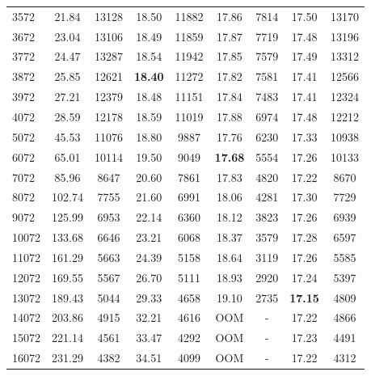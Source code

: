 \begin{table}[]
\begin{center}
\begin{tabular}{@{}lcccccccc@{}}
3572  & 21.84  & 13128 & 18.50 & 11882 & 17.86 & 7814 & 17.50 & 13170 \\
3672  & 23.04  & 13106 & 18.49 & 11859 & 17.87 & 7719 & 17.48 & 13196 \\
3772  & 24.47  & 13287 & 18.54 & 11942 & 17.85 & 7579 & 17.49 & 13312 \\
3872  & 25.85  & 12621 & \textbf{18.40} & 11272 & 17.82 & 7581 & 17.41 & 12566 \\
3972  & 27.21  & 12379 & 18.48 & 11151 & 17.84 & 7483 & 17.41 & 12324 \\
4072  & 28.59  & 12178 & 18.59 & 11019 & 17.88 & 6974 & 17.48 & 12212 \\
5072  & 45.53  & 11076 & 18.80 & 9887  & 17.76 & 6230 & 17.33 & 10938 \\
6072  & 65.01  & 10114 & 19.50 & 9049  &\textbf{ 17.68} & 5554 & 17.26 & 10133 \\
7072  & 85.96  & 8647  & 20.60 & 7861  & 17.83 & 4820 & 17.22 & 8670  \\
8072  & 102.74 & 7755  & 21.60 & 6991  & 18.06 & 4281 & 17.30 & 7729  \\
9072  & 125.99 & 6953  & 22.14 & 6360  & 18.12 & 3823 & 17.26 & 6939  \\
10072 & 133.68 & 6646  & 23.21 & 6068  & 18.37 & 3579 & 17.28 & 6597  \\
11072 & 161.29 & 5663  & 24.39 & 5158  & 18.64 & 3119 & 17.26 & 5585  \\
12072 & 169.55 & 5567  & 26.70 & 5111  & 18.93 & 2920 & 17.24 & 5397  \\
13072 & 189.43 & 5044  & 29.33 & 4658  & 19.10 & 2735 & \textbf{17.15} & 4809  \\
14072 & 203.86 & 4915  & 32.21 & 4616  & OOM   & -    & 17.22 & 4866  \\
15072 & 221.14 & 4561  & 33.47 & 4292  & OOM   & -    & 17.23 & 4491  \\
16072 & 231.29 & 4382  & 34.51 & 4099  & OOM   & -    & 17.22 & 4312  \\

 \bottomrule
\end{tabular}
\end{center}
\end{table}

